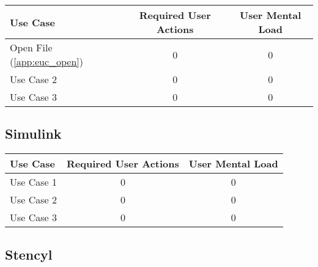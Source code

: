 \begin{tabularx}{\textwidth}{Xcc}
\textbf{Use Case} & \textbf{Required User Actions} & \textbf{User Mental Load}\\
\hline
Open File (\ref{app:euc_open}) & 0 & 0 \\
Use Case 2                     & 0 & 0 \\
Use Case 3                     & 0 & 0
\end{tabularx}

\subsection*{Simulink}




\begin{tabularx}{\textwidth}{Xcc}
\textbf{Use Case} & \textbf{Required User Actions} & \textbf{User Mental Load}\\
\hline
Use Case 1                          & 0 & 0 \\
Use Case 2                          & 0 & 0 \\
Use Case 3                          & 0 & 0
\end{tabularx}

\subsection*{Stencyl}

